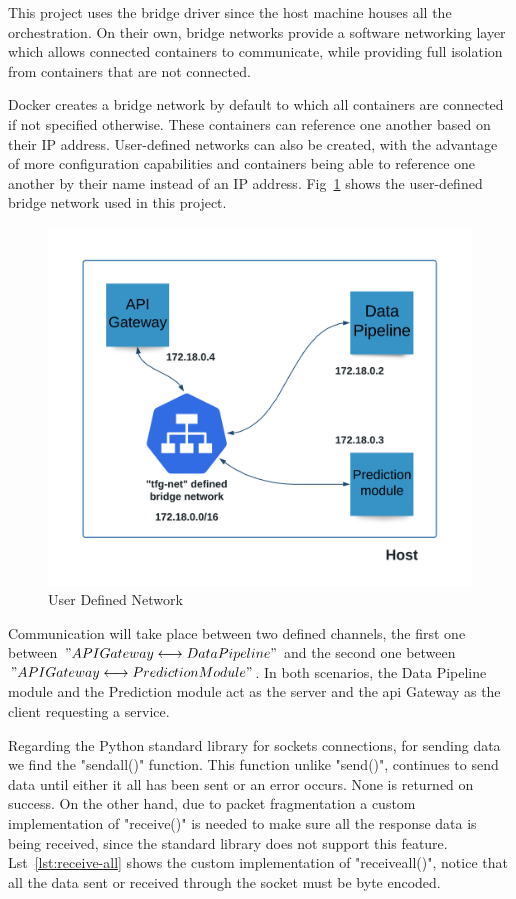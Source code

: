 This project uses the bridge driver since the host machine houses all the orchestration. On their own, bridge networks provide a software networking layer which allows connected containers to communicate, while providing full isolation from containers that are not connected.

Docker creates a bridge network by default to which all containers are connected if not specified otherwise. These containers can reference one another based on their IP address. User-defined networks can also be created, with the advantage of more configuration capabilities and containers being able to reference one another by their name instead of an IP address. Fig~\ref{fig:tfg-net} shows the user-defined bridge network used in this project.

\begin{figure}[h]
    \centering
    \includegraphics[width=\textwidth]{figures/tfg-net.png}
     \caption{User Defined Network}
    \label{fig:tfg-net}
\end{figure}

Communication will take place between two defined channels, the first one between $"API Gateway \longleftrightarrow Data Pipeline"$ and the second one between $"API Gateway \longleftrightarrow Prediction Module"$. In both scenarios, the Data Pipeline module and the Prediction module act as the server and the \gls{api} Gateway as the client requesting a service. 

Regarding the Python standard library for sockets connections, for sending data we find the "sendall()" function. This function unlike "send()", continues to send data until either it all has been sent or an error occurs. None is returned on success. On the other hand, due to packet fragmentation a custom implementation of "receive()" is needed to make sure all the response data is being received, since the standard library does not support this feature. Lst~\ref{lst:receive-all} shows the custom implementation of "receiveall()", notice that all the data sent or received through the socket must be byte encoded.\\

